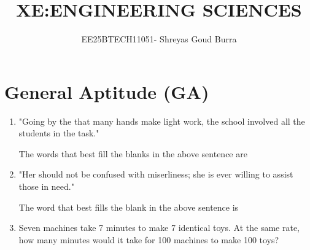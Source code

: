 \documentclass[a4paper,10pt]{article}
\title{XE:ENGINEERING SCIENCES}
\author{EE25BTECH11051- Shreyas Goud Burra}
\date{}
\begin{document}
\maketitle

\section*{General Aptitude (GA)}
\begin{enumerate}
    \item "Going by the \underline{\hspace{2cm}} that many hands make light work, the school \underline{\hspace{2cm}} involved all the students in the task."
    
    The words that best fill the blanks in the above sentence are
    \hfill{}
    \begin{enumerate}[label=\Alph*)]
    \end{enumerate}

    \item "Her \underline{\hspace{2cm}} should not be confused with miserliness; she is ever willing to assist those in need."
    
    The word that best fills the blank in the above sentence is
    \hfill{}
    \begin{enumerate}[label=\Alph*)]
    \end{enumerate}

    \item Seven machines take 7 minutes to make 7 identical toys. At the same rate, how many minutes would it take for 100 machines to make 100 toys?
    \hfill{}
    \begin{enumerate}[label=\Alph*)]
    \end{enumerate}


\end{enumerate}
\end{document}
